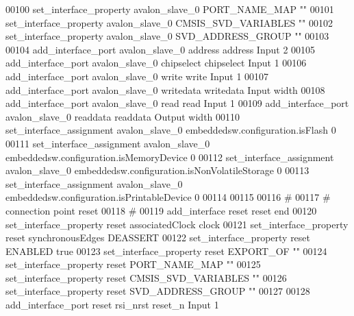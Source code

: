 \begin{DoxyCode}
00100 \textcolor{comment}{}set\_interface\_property avalon\_slave\_0 PORT\_NAME\_MAP ""\textcolor{comment}{}
00101 \textcolor{comment}{}set\_interface\_property avalon\_slave\_0 CMSIS\_SVD\_VARIABLES ""\textcolor{comment}{}
00102 \textcolor{comment}{}set\_interface\_property avalon\_slave\_0 SVD\_ADDRESS\_GROUP ""\textcolor{comment}{}
00103 \textcolor{comment}{}
00104 add\_interface\_port avalon\_slave\_0 address address Input 2\textcolor{comment}{}
00105 \textcolor{comment}{}add\_interface\_port avalon\_slave\_0 chipselect chipselect Input 1\textcolor{comment}{}
00106 \textcolor{comment}{}add\_interface\_port avalon\_slave\_0 write write Input 1\textcolor{comment}{}
00107 \textcolor{comment}{}add\_interface\_port avalon\_slave\_0 writedata writedata Input width\textcolor{comment}{}
00108 \textcolor{comment}{}add\_interface\_port avalon\_slave\_0 read read Input 1\textcolor{comment}{}
00109 \textcolor{comment}{}add\_interface\_port avalon\_slave\_0 readdata readdata Output width\textcolor{comment}{}
00110 \textcolor{comment}{}set\_interface\_assignment avalon\_slave\_0 embeddedsw.configuration.isFlash 0\textcolor{comment}{}
00111 \textcolor{comment}{}set\_interface\_assignment avalon\_slave\_0 embeddedsw.configuration.isMemoryDevice 0\textcolor{comment}{}
00112 \textcolor{comment}{}set\_interface\_assignment avalon\_slave\_0 embeddedsw.configuration.isNonVolatileStorage 0\textcolor{comment}{}
00113 \textcolor{comment}{}set\_interface\_assignment avalon\_slave\_0 embeddedsw.configuration.isPrintableDevice 0\textcolor{comment}{}
00114 \textcolor{comment}{}
00115 
00116 \textcolor{comment}{# }
00117 \textcolor{comment}{}\textcolor{comment}{# connection point reset}
00118 \textcolor{comment}{}\textcolor{comment}{# }
00119 \textcolor{comment}{}add\_interface reset reset end\textcolor{comment}{}
00120 \textcolor{comment}{}set\_interface\_property reset associatedClock clock\textcolor{comment}{}
00121 \textcolor{comment}{}set\_interface\_property reset synchronousEdges DEASSERT\textcolor{comment}{}
00122 \textcolor{comment}{}set\_interface\_property reset ENABLED true\textcolor{comment}{}
00123 \textcolor{comment}{}set\_interface\_property reset EXPORT\_OF ""\textcolor{comment}{}
00124 \textcolor{comment}{}set\_interface\_property reset PORT\_NAME\_MAP ""\textcolor{comment}{}
00125 \textcolor{comment}{}set\_interface\_property reset CMSIS\_SVD\_VARIABLES ""\textcolor{comment}{}
00126 \textcolor{comment}{}set\_interface\_property reset SVD\_ADDRESS\_GROUP ""\textcolor{comment}{}
00127 \textcolor{comment}{}
00128 add\_interface\_port reset rsi\_nrst reset\_n Input 1\textcolor{comment}{}

\end{DoxyCode}
